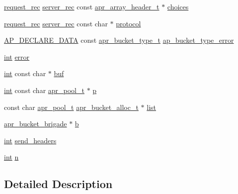 \begin{DoxyCompactItemize}
\item 
\hyperlink{structrequest__rec}{request\+\_\+rec} \hyperlink{structserver__rec}{server\+\_\+rec} const \hyperlink{structapr__array__header__t}{apr\+\_\+array\+\_\+header\+\_\+t} $\ast$ \hyperlink{group__APACHE__CORE__PROTO_gaad026036a61deca62b44551b09f67628}{choices}
\item 
\hyperlink{structrequest__rec}{request\+\_\+rec} \hyperlink{structserver__rec}{server\+\_\+rec} const char $\ast$ \hyperlink{group__APACHE__CORE__PROTO_gab4455c9ffced5cbd2748a0585c988a2f}{protocol}
\item 
\hyperlink{ap__config_8h_a0bb4c3adf74510a0dcdad5b125725fe0}{A\+P\+\_\+\+D\+E\+C\+L\+A\+R\+E\+\_\+\+D\+A\+TA} const \hyperlink{structapr__bucket__type__t}{apr\+\_\+bucket\+\_\+type\+\_\+t} \hyperlink{group__APACHE__CORE__PROTO_gaef3fea180ac64dff60327a7eda6161f4}{ap\+\_\+bucket\+\_\+type\+\_\+error}
\item 
\hyperlink{pcre_8txt_a42dfa4ff673c82d8efe7144098fbc198}{int} \hyperlink{group__APACHE__CORE__PROTO_ga11614f44ef4d939bdd984953346a7572}{error}
\item 
\hyperlink{pcre_8txt_a42dfa4ff673c82d8efe7144098fbc198}{int} const char $\ast$ \hyperlink{group__APACHE__CORE__PROTO_ga17bc47ccf1b618ed082a4ff4f2cc7f7e}{buf}
\item 
\hyperlink{pcre_8txt_a42dfa4ff673c82d8efe7144098fbc198}{int} const char \hyperlink{structapr__pool__t}{apr\+\_\+pool\+\_\+t} $\ast$ \hyperlink{group__APACHE__CORE__PROTO_ga2b87ce5c0cd5c5aa97fd3ba98460ab16}{p}
\item 
const char \hyperlink{structapr__pool__t}{apr\+\_\+pool\+\_\+t} \hyperlink{structapr__bucket__alloc__t}{apr\+\_\+bucket\+\_\+alloc\+\_\+t} $\ast$ \hyperlink{group__APACHE__CORE__PROTO_gaeb6b944e4524f915483b5696b7f2f424}{list}
\item 
\hyperlink{structapr__bucket__brigade}{apr\+\_\+bucket\+\_\+brigade} $\ast$ \hyperlink{group__APACHE__CORE__PROTO_ga7fa09c5c80a7d25b74511944f5949e31}{b}
\item 
\hyperlink{pcre_8txt_a42dfa4ff673c82d8efe7144098fbc198}{int} \hyperlink{group__APACHE__CORE__PROTO_gac891dd64bc992a549275a12793e2b90a}{send\+\_\+headers}
\item 
\hyperlink{pcre_8txt_a42dfa4ff673c82d8efe7144098fbc198}{int} \hyperlink{group__APACHE__CORE__PROTO_gad484edfd58b9127caa8f0f59b4004d09}{n}
\end{DoxyCompactItemize}


\subsection{Detailed Description}


